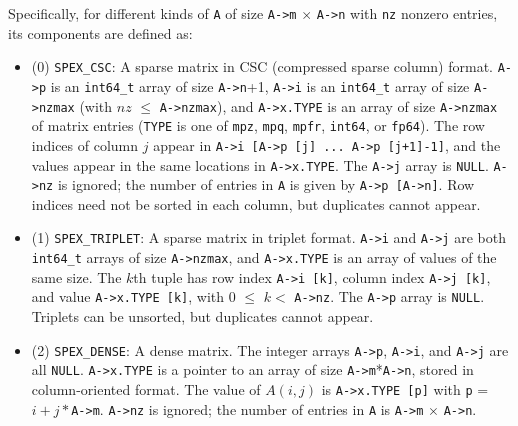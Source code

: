 \documentclass[12pt]{report}
\theoremstyle{definition}
\begin{document}
Specifically, for different kinds of \verb|A| of size \verb|A->m| $\times$ \verb|A->n|
with \verb|nz| nonzero entries, its components are defined as:

\begin{itemize}
\item
 (0) \verb|SPEX_CSC|:  A sparse matrix in CSC (compressed sparse column) format.
      \verb|A->p| is an \verb|int64_t| array of size \verb|A->n|+1, \verb|A->i|
      is an \verb|int64_t| array of size \verb|A->nzmax| (with $nz$ $\le$
      \verb|A->nzmax|), and \verb|A->x.TYPE| is an array of size
      \verb|A->nzmax| of matrix entries (\verb'TYPE' is one of \verb|mpz|,
      \verb|mpq|, \verb|mpfr|, \verb|int64|, or \verb|fp64|).  The row indices
      of column $j$ appear in \verb|A->i [A->p [j] ... A->p [j+1]-1]|, and the
      values appear in the same locations in \verb|A->x.TYPE|.  The \verb|A->j|
      array is \verb|NULL|.  \verb|A->nz| is ignored; the number of entries in
      \verb|A| is given by \verb|A->p [A->n]|.
      Row indices need not be sorted in each column, but duplicates cannot
      appear.

\item
 (1) \verb|SPEX_TRIPLET|:  A sparse matrix in triplet format.  \verb|A->i| and
     \verb|A->j| are both \verb|int64_t| arrays of size \verb|A->nzmax|, and
     \verb|A->x.TYPE| is an array of values of the same size.  The $k$th tuple
     has row index \verb|A->i [k]|, column index \verb|A->j [k]|, and value
     \verb|A->x.TYPE [k]|, with 0 $\le$ $k <$ \verb|A->nz|.
     The \verb|A->p| array is \verb|NULL|.
     Triplets can be unsorted, but duplicates cannot appear.

\item
 (2) \verb|SPEX_DENSE|:  A dense matrix.  The integer arrays \verb|A->p|,
     \verb|A->i|, and \verb|A->j| are all \verb|NULL|.  \verb|A->x.TYPE| is a
     pointer to an array of size \verb|A->m|*\verb|A->n|, stored in
     column-oriented format.  The value of $A(i,j)$ is \verb|A->x.TYPE [p]|
     with \verb|p| = $i + j*$\verb|A->m|.  \verb|A->nz| is ignored; the number
     of entries in \verb|A| is \verb|A->m| $\times$ \verb|A->n|.


\end{itemize}
\end{document}

